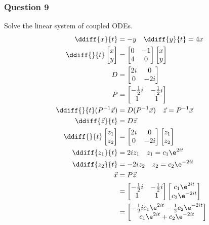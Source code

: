 \documentclass{math}
\begin{document}
\subsubsection*{Question 9}
Solve the linear system of coupled ODEs.
\begin{align*}
  \ddiff{x}{t} &= -y \quad \ddiff{y}{t} = 4x \\
  \ddiff{}{t}\begin{bmatrix}x \\ y\end{bmatrix} &= \begin{bmatrix}
    0 & -1 \\ 4 & 0
  \end{bmatrix}\begin{bmatrix}x \\ y\end{bmatrix} \\
  D &= \begin{bmatrix}
    2i & 0 \\ 0 & -2i
  \end{bmatrix} \\
  P &= \begin{bmatrix}
    -\frac{1}{2}i & -\frac{1}{2}i \\ 1 & 1
  \end{bmatrix} \\
  \ddiff{}{t}(P^{-1}\vec{x}) &= D(P^{-1}\vec{x}) \quad
    \vec{z} = P^{-1}\vec{x} \\
  \ddiff{\vec{z}}{t} &= D\vec{z} \\
  \ddiff{}{t}\begin{bmatrix}z_1 \\ z_2\end{bmatrix} &=
    \begin{bmatrix}2i & 0 \\ 0 & -2i\end{bmatrix}
    \begin{bmatrix}z_1 \\ z_2\end{bmatrix} \\
  \ddiff{z_1}{t} &= 2iz_1 \quad z_1 = c_1\e^{2it} \\
  \ddiff{z_2}{t} &= -2iz_2 \quad z_2 = c_2\e^{-2it} \\
  \vec{x} &= P\vec{z} \\
  &= \begin{bmatrix}
    -\frac{1}{2}i & -\frac{1}{2}i \\ 1 & 1
  \end{bmatrix}\begin{bmatrix}
    c_1\e^{2it} \\ c_2\e^{-2it}
  \end{bmatrix} \\
  &= \begin{bmatrix}
    -\frac{1}{2}ic_1\e^{2it}-\frac{1}{2}c_2\e^{-2it} \\
    c_1\e^{2it}+c_2\e^{-2it}
  \end{bmatrix}
\end{align*}
\end{document}

